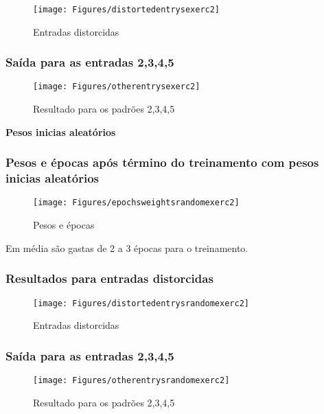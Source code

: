 \documentclass[hidelinks,12pt]{article}
\begin{document}
		\begin{figure}[h!]
			\centering
			\texttt{[image: Figures/distortedentrysexerc2]}
			\caption{Entradas distorcidas}
		\end{figure}
		
	\subsubsection{Saída para as entradas 2,3,4,5}

		\begin{figure}[h!]
			\centering
			\texttt{[image: Figures/otherentrysexerc2]}
			\caption{Resultado para os padrões 2,3,4,5}
		\end{figure}
	
	{\textbf{\large Pesos inicias aleatórios}}
	
	\newpage
	\subsubsection{Pesos e épocas após término do treinamento com pesos inicias aleatórios}

		\begin{figure}[h!]
			\centering
			\texttt{[image: Figures/epochsweightsrandomexerc2]}
			\caption{Pesos e épocas}
		\end{figure}
	
		\normalsize Em média são gastas de 2 a 3 épocas para o treinamento.
	
	\subsubsection{Resultados para entradas distorcidas}

		\begin{figure}[h!]
			\centering
			\texttt{[image: Figures/distortedentrysrandomexerc2]}
			\caption{Entradas distorcidas}
		\end{figure}

	\newpage
	\subsubsection{Saída para as entradas 2,3,4,5}

		\begin{figure}[h!]
			\centering
			\texttt{[image: Figures/otherentrysrandomexerc2]}
			\caption{Resultado para os padrões 2,3,4,5}
		\end{figure}
\end{document}
